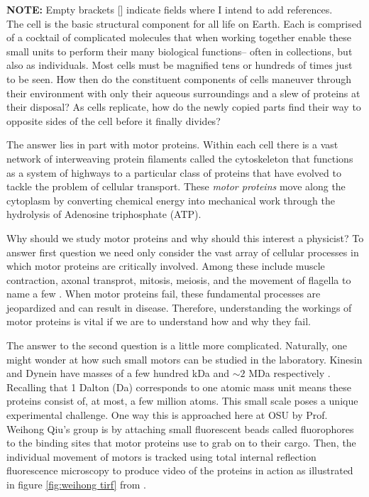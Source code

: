 \textbf{NOTE:} Empty brackets [] indicate fields where I intend to add references. \\

The cell is the basic structural component for all life on Earth. Each is comprised of a cocktail of complicated molecules that when working together enable these small units to perform their many biological functions-- often in collections, but also as individuals. Most cells must be magnified tens or hundreds of times just to be seen. How then do the constituent components of cells maneuver through their environment with only their aqueous surroundings and a slew of proteins at their disposal? As cells replicate, how do the newly copied parts find their way to opposite sides of the cell before it finally divides? 

The answer lies in part with motor proteins. Within each cell there is a vast network of interweaving protein filaments called the cytoskeleton that functions as a system of  highways to a particular class of proteins that have evolved to tackle the problem of cellular transport. These \textit{motor proteins} move along the cytoplasm by converting chemical energy into mechanical work through the hydrolysis of Adenosine triphosphate (ATP).

Why should we study motor proteins and why should this interest a physicist? To answer first question we need only consider the vast array of cellular processes in which motor proteins are critically involved. Among these include muscle contraction, axonal transprot, mitosis, meiosis, and the movement of flagella to name a few \cite{}. When motor proteins fail, these fundamental processes are jeopardized and can result in disease\cite{hirokawa_biochemical_2003}. Therefore, understanding the workings of motor proteins is vital if we are to understand how and why they fail. 

The answer to the second question is a little more complicated. Naturally, one might wonder at how such small motors can be studied in the laboratory. Kinesin and Dynein have masses of a few hundred kDa and  $\sim2$ MDa respectively \cite{liao_kinesin_1998, johnson_structure_1983}. Recalling that 1 Dalton (Da) corresponds to one atomic mass unit means these proteins consist of, at most, a few million atoms. This small scale poses a unique experimental challenge. One way this is approached here at OSU by Prof. Weihong Qiu's group is by attaching small fluorescent beads called fluorophores to the binding sites that motor proteins use to grab on to their cargo. Then, the individual movement of motors is tracked using total internal reflection fluorescence microscopy to produce video of the proteins in action as illustrated in figure \ref{fig:weihong tirf} from \cite{qiu_dynein_2012}. 

